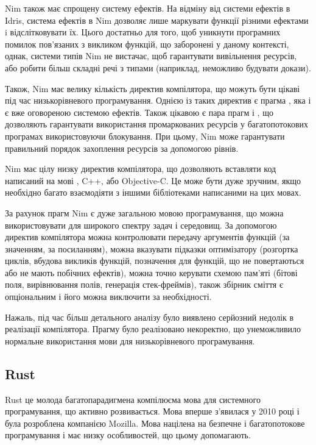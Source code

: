 \documentclass[main.tex]{subfiles}
\begin{document}
Nim також має спрощену систему ефектів. На відміну від системи ефектів в Idris, система ефектів в Nim дозволяє лише маркувати функції різними ефектами i відслітковувати їх. Цього достатньо для того, щоб уникнути програмних помилок пов'язаних з викликом функцій, що заборонені у даному контексті, однак, системи типів Nim не вистачає, щоб гарантувати вивільнення ресурсів, або робити більш складні речі з типами (наприклад, неможливо будувати докази).

Також, Nim має велику кількість директив компілятора\cite{nim:directives}, що можуть бути цікаві під час низькорівневого програмування. Однією із таких директив є прагма , яка і є вже оговореною системою ефектів. Також цікавою є пара прагм  і , що дозволяють гарантувати використання промаркованих ресурсів у багатопотокових програмах використовуючи блокування. При цьому, Nim може гарантувати правильний порядок захоплення ресурсів за допомогою рівнів.

Nim має цілу низку директив компілятора, що дозволяють вставляти код написаний на мові \LangC{}, C++, або Objective-C. Це може бути дуже зручним, якщо необхідно багато взаємодіяти з іншими бібліотеками написаними на цих мовах.

За рахунок прагм Nim є дуже загальною мовою програмування, що можна використовувати для широкого спектру задач і середовищ. За допомогою директив компілятора можна контролювати передачу аргументів функцій (за значенням, за посиланням), можна вказувати підказки оптимізатору (розгортка циклів, вбудова викликів функцій, позначення для функцій, що не повертаються або не мають побічних ефектів), можна точно керувати схемою пам'яті (бітові поля, вирівнювання полів, генерація стек-фреймів), також збірник сміття є опціональним і його можна виключити за необхідності.

Нажаль, під час більш детального аналізу було виявлено серйозний недолік в реалізації компілятора. Прагму  було реалізовано некоректно\cite{nim:volatile}, що унеможливило нормальне використання мови для низькорівневого програмування.

\subsection{Rust}

Rust\cite{rust} це молода багатопарадигмена компілюєма мова для системного програмування, що активно розвивається. Мова вперше з'явилася у 2010 році і була розроблена компанією Mozilla\cite{rust:mozilla}. Мова націлена на безпечне і багатопотокове програмування і має низку особливостей, що цьому допомагають.
\end{document}
